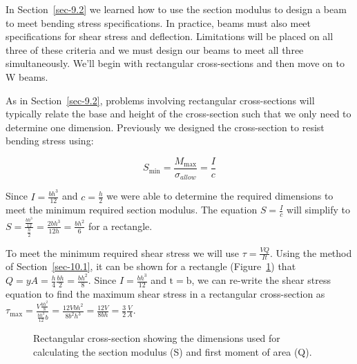 \documentclass[
  letterpaper,
  DIV=11,
  numbers=noendperiod]{scrreprt}
\theoremstyle{definition}
\theoremstyle{remark}
\begin{document}
In Section~\ref{sec-9.2} we learned how to use the section modulus to
design a beam to meet bending stress specifications. In practice, beams
must also meet specifications for shear stress and deflection.
Limitations will be placed on all three of these criteria and we must
design our beams to meet all three simultaneously. We'll begin with
rectangular cross-sections and then move on to W beams.

As in Section~\ref{sec-9.2}, problems involving rectangular
cross-sections will typically relate the base and height of the
cross-section such that we only need to determine one dimension.
Previously we designed the cross-section to resist bending stress using:

\[
S_{\min }=\frac{M_{\max }}{\sigma_{allow}}=\frac{I}{c}
\]

Since \(I=\frac{b h^{3}}{12}\) and \(c=\frac{h}{2}\) we were able to
determine the required dimensions to meet the minimum required section
modulus. The equation \(S=\frac{I}{c}\) will simplify to
\(S=\frac{\frac{b h^{3}}{12}}{\frac{h}{2}}=\frac{2 b h^{3}}{12 h}=\frac{b h^{2}}{6}\)
for a rectangle.

To meet the minimum required shear stress we will use
\(\tau=\frac{V Q}{I t}\). Using the method of Section~\ref{sec-10.1}, it
can be shown for a rectangle (Figure~\ref{fig-11.8}) that
\(Q=y A=\frac{h}{4} \frac{b h}{2}=\frac{b h^{2}}{8}\). Since
\(I=\frac{b h^{3}}{12}\) and \(\mathrm{t}=\mathrm{b}\), we can re-write
the shear stress equation to find the maximum shear stress in a
rectangular cross-section as
\(\tau_{\max }=\frac{V \frac{b h^{2}}{8}}{\frac{b h^{3}}{12} b}=\frac{12 V b h^{2}}{8 b^{2} h^{3}}=\frac{12 V}{8 b h}=\frac{3}{2} \frac{V}{A}\).

\begin{figure}


\caption{\label{fig-11.8}Rectangular cross-section showing the
dimensions used for calculating the section modulus (S) and first moment
of area (Q).}

\end{figure}%
\end{document}
